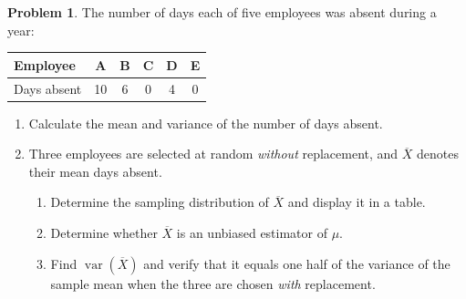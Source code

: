 \documentclass[11pt,a4paper]{article}
\theoremstyle{definition}
\newtheorem{problemx}{Problem}[section]
\newenvironment{problem}{\begin{problemx}}{\end{problemx}}
\begin{document}
\begin{problem}
The number of days each of five employees was absent during a year:
\begin{table}[H]
\centering
\begin{tabular}{|l|c|c|c|c|c|}
\hline
Employee & A & B & C & D & E\\
\hline
Days absent & 10 & 6 & 0 & 4 & 0\\
\hline
\end{tabular}
\end{table}
\begin{enumerate}
\item[(a).] Calculate the mean and variance of the number of days absent.
\item[(b).] Three employees are selected at random \emph{without} replacement, and
$\overline{X}$ denotes their mean days absent.
\begin{enumerate}
\item[(i).] Determine the sampling distribution of $\overline{X}$ and display it in a table.
\item[(ii).] Determine whether $\overline{X}$ is an unbiased estimator of $\mu$.
\item[(iii).] Find $\operatorname{var}(\overline{X})$ and verify that it equals one half of
the variance of the sample mean when the three are chosen \emph{with} replacement.
\end{enumerate}
\end{enumerate}
\end{problem}
\end{document}
